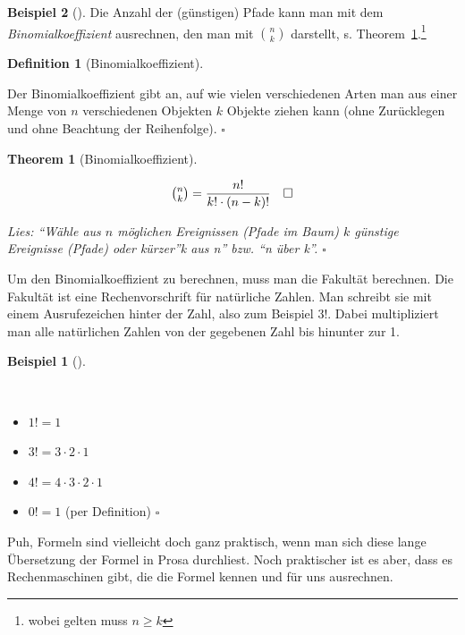 \documentclass[
  ngerman,
  letterpaper,
  twoside,
  open=any]{scrbook}
\providecommand{\tightlist}{%
  \setlength{\itemsep}{0pt}\setlength{\parskip}{0pt}}\usepackage{longtable,booktabs,array}
\theoremstyle{definition}
\newtheorem{example}{Beispiel}[chapter]
\theoremstyle{plain}
\newtheorem{theorem}{Theorem}[chapter]
\theoremstyle{definition}
\theoremstyle{definition}
\newtheorem{definition}{Definition}[chapter]
\theoremstyle{remark}
\begin{document}
\begin{example}[]
Die Anzahl der (günstigen) Pfade kann man mit dem
\emph{Binomialkoeffizient} ausrechnen, den man mit \(\binom{n}{k}\)
darstellt, s. Theorem~\ref{thm-binkoeff}.\footnote{wobei gelten muss
  \(n \ge k\)}

\begin{definition}[Binomialkoeffizient]\protect\hypertarget{def-binkoeff}{}\label{def-binkoeff}

Der Binomialkoeffizient gibt an, auf wie vielen verschiedenen Arten man
aus einer Menge von \(n\) verschiedenen Objekten \(k\) Objekte ziehen
kann (ohne Zurücklegen und ohne Beachtung der Reihenfolge). \(\square\)

\end{definition}

\begin{theorem}[Binomialkoeffizient]\protect\hypertarget{thm-binkoeff}{}\label{thm-binkoeff}

\[\tbinom{n}{k}= \frac{n!}{k!\cdot (n-k)!} \quad \square\]

Lies: \enquote{Wähle aus \(n\) möglichen Ereignissen (Pfade im Baum)
\(k\) günstige Ereignisse (Pfade) oder kürzer}k aus n'' bzw. \enquote{n
über k}. \(\square\)

\end{theorem}

Um den Binomialkoeffizient zu berechnen, muss man die Fakultät
berechnen. Die Fakultät ist eine Rechenvorschrift für natürliche Zahlen.
Man schreibt sie mit einem Ausrufezeichen hinter der Zahl, also zum
Beispiel \(3!\). Dabei multipliziert man alle natürlichen Zahlen von der
gegebenen Zahl bis hinunter zur 1.

\begin{example}[]\protect\hypertarget{exm-fakultaet}{}\label{exm-fakultaet}

~

\begin{itemize}
\tightlist
\item
  \(1! = 1\)
\item
  \(3! = 3 \cdot 2 \cdot 1\)
\item
  \(4! = 4 \cdot 3 \cdot 2 \cdot 1\)
\item
  \(0! = 1\) (per Definition) \(\square\)
\end{itemize}

\end{example}

Puh, Formeln sind vielleicht doch ganz praktisch, wenn man sich diese
lange Übersetzung der Formel in Prosa durchliest. Noch praktischer ist
es aber, dass es Rechenmaschinen gibt, die die Formel kennen und für uns
ausrechnen.


\end{example}
\end{document}
